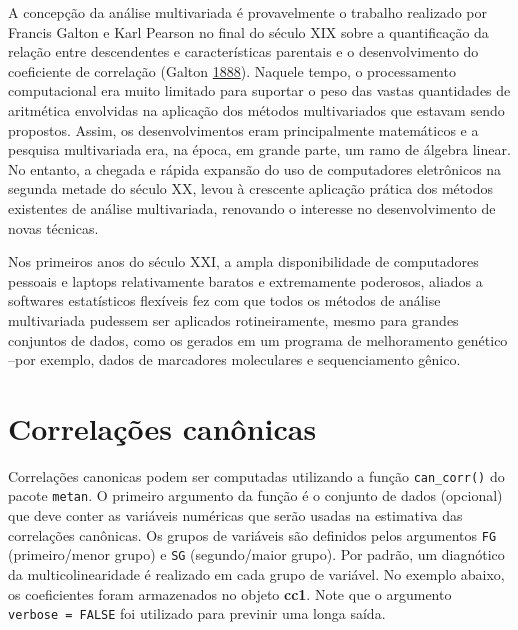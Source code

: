 \documentclass[
]{book}
\makeatletter
\numberwithin{equation}{section}
\newcommand{\indf}[1]{\index[function]{#1@\texttt{#1()}|ST}}
\newcommand{\indt}[1]{\index{#1|ST}}
\makeatother
\begin{document}
A concepção da análise multivariada \indt{análise multivariada} é provavelmente o trabalho realizado por Francis Galton e Karl Pearson no final do século XIX sobre a quantificação da relação entre descendentes e características parentais e o desenvolvimento do coeficiente de correlação (Galton \protect\hyperlink{ref-Galton1888}{1888}). Naquele tempo, o processamento computacional era muito limitado para suportar o peso das vastas quantidades de aritmética envolvidas na aplicação dos métodos multivariados que estavam sendo propostos. Assim, os desenvolvimentos eram principalmente matemáticos e a pesquisa multivariada era, na época, em grande parte, um ramo de álgebra linear. No entanto, a chegada e rápida expansão do uso de computadores eletrônicos na segunda metade do século XX, levou à crescente aplicação prática dos métodos existentes de análise multivariada, renovando o interesse no desenvolvimento de novas técnicas.

Nos primeiros anos do século XXI, a ampla disponibilidade de computadores pessoais e laptops relativamente baratos e extremamente poderosos, aliados a softwares estatísticos flexíveis fez com que todos os métodos de análise multivariada pudessem ser aplicados rotineiramente, mesmo para grandes conjuntos de dados, como os gerados em um programa de melhoramento genético --por exemplo, dados de marcadores moleculares e sequenciamento gênico.

\hypertarget{correlauxe7uxf5es-canuxf4nicas}{%
\section{Correlações canônicas}\label{correlauxe7uxf5es-canuxf4nicas}}

Correlações canonicas podem ser computadas utilizando a função \texttt{can\_corr()} do pacote \texttt{metan}.\indf{can\_corr} O primeiro argumento da função é o conjunto de dados (opcional) que deve conter as variáveis numéricas que serão usadas na estimativa das correlações canônicas. Os grupos de variáveis são definidos pelos argumentos \texttt{FG} (primeiro/menor grupo) e \texttt{SG} (segundo/maior grupo). Por padrão, um diagnótico da multicolinearidade é realizado em cada grupo de variável. No exemplo abaixo, os coeficientes foram armazenados no objeto \textbf{cc1}. Note que o argumento \texttt{verbose\ =\ FALSE} foi utilizado para previnir uma longa saída.
\end{document}
